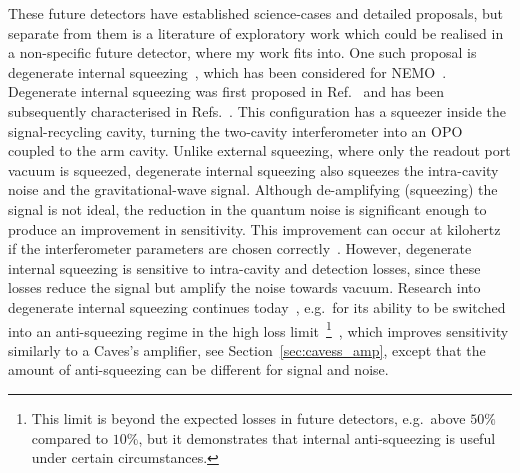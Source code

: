 These future detectors have established science-cases  and detailed proposals, but separate from them is a literature of exploratory work which could be realised in a non-specific future detector, where my work fits into. %
One such proposal is degenerate internal squeezing~\cite{Korobko2019,Adya2020}, which has been considered for NEMO~\cite{}. 
Degenerate internal squeezing was first proposed in Ref.~\cite{Korobko2019} and has been subsequently characterised in Refs.~\cite{Adya2020,Korobko?,}. 
This configuration has a squeezer inside the signal-recycling cavity, turning the two-cavity interferometer into an OPO coupled to the arm cavity. Unlike external squeezing, where only the readout port vacuum is squeezed, degenerate internal squeezing also squeezes the intra-cavity noise and the gravitational-wave signal. Although de-amplifying (squeezing) the signal is not ideal, the reduction in the quantum noise is significant enough to produce an improvement in sensitivity. This improvement can occur at kilohertz if the interferometer parameters are chosen correctly~\cite{}. However, degenerate internal squeezing is sensitive to intra-cavity and detection losses, since these losses reduce the signal but amplify the noise towards vacuum. 
Research into degenerate internal squeezing continues today~\cite{}, e.g.\ for its ability to be switched into an anti-squeezing regime in the high loss limit~\footnote{This limit is beyond the expected losses in future detectors, e.g.\ above $50\%$ compared to $10\%$, but it demonstrates that internal anti-squeezing is useful under certain circumstances.}~\cite{KorobkoTalk}, which improves sensitivity similarly to a Caves's amplifier, see Section~\ref{sec:cavess_amp}, except that the amount of anti-squeezing can be different for signal and noise.

